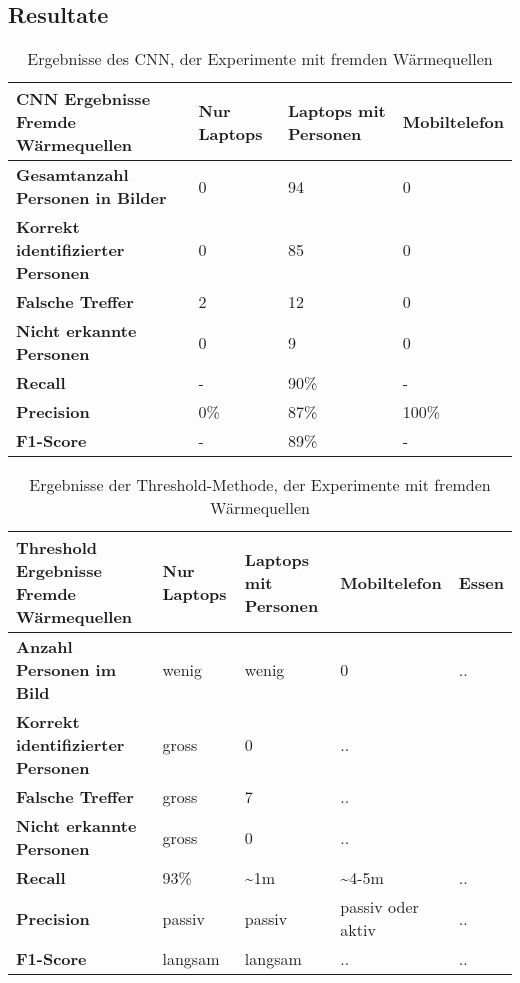 \subsection{Resultate}

\begin{table}[H]
	\begin{tabularx}{\textwidth}{|X|X|X|X|}
		\hline
		\textbf{\gls{CNN} Ergebnisse Fremde Wärmequellen} & \textbf{Nur Laptops} & \textbf{Laptops mit Personen} & \textbf{Mobiltelefon}\\
		\hline 
		\textbf{Gesamtanzahl Personen in Bilder} & 0 & 94 & 0\\
		\hline
		\textbf{Korrekt identifizierter Personen} & 0 & 85 & 0 \\
		\hline
		\textbf{Falsche Treffer} & 2 & 12 & 0 \\
		\hline
		\textbf{Nicht erkannte Personen} & 0 & 9 & 0\\
		\hline
		\textbf{Recall} & - & 90\% & -\\
		\hline  
		\textbf{Precision} & 0\% & 87\% & 100\%\\
		\hline
		\textbf{F1-Score} & - & 89\% & - \\
		\hline
	\end{tabularx}
	\caption{Ergebnisse des \gls{CNN}, der Experimente mit fremden Wärmequellen}
	\label{tbl:heatSources}
\end{table}

\begin{table}[H]
	\begin{tabularx}{\textwidth}{|X|X|X|X|X|}
		\hline
		\textbf{Threshold Ergebnisse Fremde Wärmequellen} & \textbf{Nur Laptops} & \textbf{Laptops mit Personen} & \textbf{Mobiltelefon} & \textbf{Essen}\\
		\hline 
		\textbf{Anzahl Personen im Bild} & wenig & wenig & 0 & ..\\
		\hline
		\textbf{Korrekt identifizierter Personen} & gross & 0 &..\\
		\hline
		\textbf{Falsche Treffer} & gross & 7 &..\\
		\hline
		\textbf{Nicht erkannte Personen} & gross & 0 &..\\
		\hline
		\textbf{Recall} & 93\% & \textasciitilde 1m & \textasciitilde 4-5m & ..\\
		\hline  
		\textbf{Precision} & passiv & passiv & passiv oder aktiv & ..\\
		\hline
		\textbf{F1-Score} & langsam & langsam & .. & ..\\
		\hline
	\end{tabularx}
	\caption{Ergebnisse der Threshold-Methode, der Experimente mit fremden Wärmequellen}
	\label{tbl:threshHeatSources}
\end{table}

